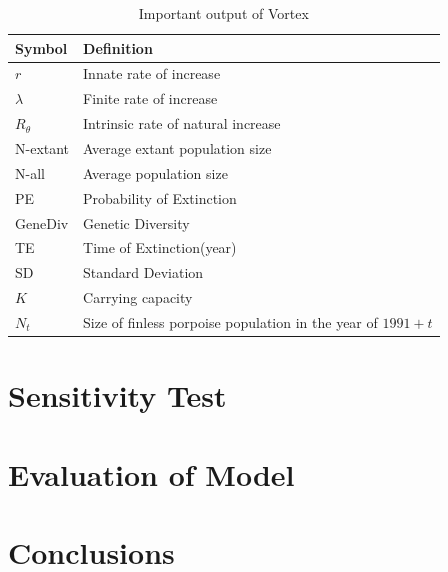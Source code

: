 \documentclass{mcmthesis}
\numberwithin{figure}{section}
\numberwithin{table}{section}
\numberwithin{equation}{section}
\begin{document}
\begin{table}[htpb!]
  \centering
  \caption{Important output of Vortex} \label{Vortex_out}
  \begin{tabular}{m{2.5cm}<{\centering}|m{12.5cm}<{\centering}}
    \toprule[1.5pt]
    \textbf{Symbol} & \textbf{Definition} \\ \hline
    $ r $ & Innate rate of increase \\
    $ \lambda $ & Finite rate of increase \\
    $ R_\theta $ &  Intrinsic rate of natural increase\\
    N-extant  & Average extant population size\\ 
    N-all  & Average population size \\
    PE  & Probability of Extinction \\
    GeneDiv  &  Genetic Diversity \\
    TE & Time of Extinction(year) \\
    SD & Standard Deviation \\
    $ K $ & Carrying capacity \\ 
    $ N_t $ & Size of finless porpoise population in the year of $ 1991 + t $ \\ 
    \bottomrule[1.5pt]
  \end{tabular}
\end{table}













\section{Sensitivity Test}

\section{Evaluation of Model}

\section{Conclusions}
\end{document}
